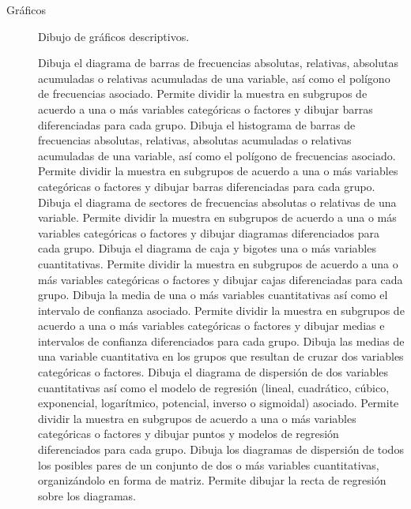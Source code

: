 \documentclass[10pt,twoside,spanish]{article}
\numberwithin{equation}{section}
\begin{document}
\begin{description}
\item[Gráficos] Dibujo de gráficos descriptivos.
\begin{itemize}
 Dibuja el diagrama de barras de frecuencias absolutas, relativas, absolutas acumuladas o relativas acumuladas de
una variable, así como el polígono de frecuencias asociado. 
Permite dividir la muestra en subgrupos de acuerdo a una o más variables categóricas o factores y dibujar barras diferenciadas para cada
grupo.
 Dibuja el histograma de barras de frecuencias absolutas, relativas, absolutas acumuladas o relativas acumuladas de
una variable, así como el polígono de frecuencias asociado. 
Permite dividir la muestra en subgrupos de acuerdo a una o más variables categóricas o factores y dibujar barras diferenciadas para cada
grupo.
 Dibuja el diagrama de sectores de frecuencias absolutas o relativas de una variable.
Permite dividir la muestra en subgrupos de acuerdo a una o más variables categóricas o factores y dibujar diagramas diferenciados para cada
grupo.
 Dibuja el diagrama de caja y bigotes una o más variables cuantitativas. 
Permite dividir la muestra en subgrupos de acuerdo a una o más variables categóricas o factores y dibujar cajas diferenciadas para cada
grupo.
 Dibuja la media de una o más variables cuantitativas así como el intervalo de confianza asociado.  
Permite dividir la muestra en subgrupos de acuerdo a una o más variables categóricas o factores y dibujar medias e intervalos de confianza
diferenciados para cada grupo.
 Dibuja las medias de una variable cuantitativa en los grupos que resultan de cruzar dos variables
categóricas o factores. 
 Dibuja el diagrama de dispersión de dos variables cuantitativas así como el modelo de
regresión (lineal, cuadrático, cúbico, exponencial, logarítmico, potencial, inverso o sigmoidal) asociado. 
Permite dividir la muestra en subgrupos de acuerdo a una o más variables categóricas o factores y dibujar puntos y modelos de regresión 
diferenciados para cada grupo.
 Dibuja los diagramas de dispersión de todos los posibles pares de un conjunto de dos o más variables
cuantitativas, organizándolo en forma de matriz. Permite dibujar la recta de regresión sobre los diagramas.
\end{itemize}


\end{description}
\end{document}
